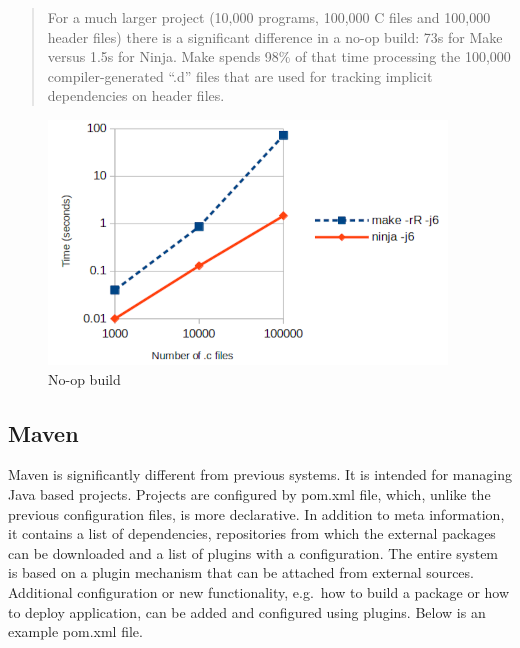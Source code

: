\begin{quote}
For a much larger project (10,000 programs, 100,000 C files and 100,000
header files) there is a significant difference in a no-op build: 73s
for Make versus 1.5s for Ninja. Make spends 98\% of that time processing
the 100,000 compiler-generated ``.d'' files that are used for tracking
implicit dependencies on header files.
\end{quote}

\begin{figure}
\centering
\includegraphics{./no-op-build.png}
\caption{No-op build}
\end{figure}

\hypertarget{maven}{%
\subsection{Maven}\label{maven}}

Maven is significantly different from previous systems. It is intended
for managing Java based projects. Projects are configured by pom.xml
file, which, unlike the previous configuration files, is more
declarative. In addition to meta information, it contains a list of
dependencies, repositories from which the external packages can be
downloaded and a list of plugins with a configuration. The entire system
is based on a plugin mechanism that can be attached from external
sources. Additional configuration or new functionality, e.g.~how to
build a package or how to deploy application, can be added and
configured using plugins. Below is an example pom.xml file.


